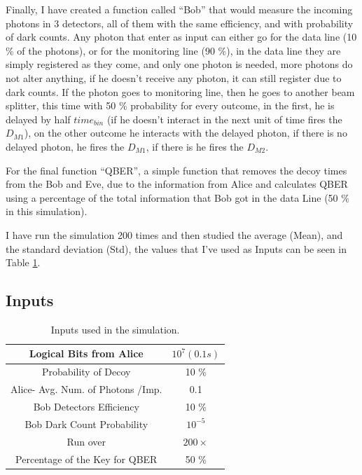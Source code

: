 \begin{refsection}
Finally, I have created a function called ``Bob'' that would measure the incoming photons in 3 detectors, all of them with the same efficiency, and with probability of dark counts. Any photon that enter as input can either go for the data line (10 \% of the photons), or for the monitoring line (90 \%), in the data line they are simply registered as they come, and only one photon is needed, more photons do not alter anything, if he doesn't receive any photon, it can still register due to dark counts. If the photon goes to monitoring line, then he goes to another beam splitter, this time with 50 \% probability for every outcome, in the first, he is delayed by half $time_{bin}$ (if he doesn't interact in the next unit of time fires the $D_{M1}$), on the other outcome he interacts with the delayed photon, if there is no delayed photon, he fires the $D_{M1}$, if there is he fires the $D_{M2}$.

For the final function ``QBER'', a simple function that removes the decoy times from the Bob and Eve, due to the information from Alice and calculates QBER using a percentage of the total information that Bob got in the data Line (50 \% in this simulation).

I have run the simulation 200 times and then studied the average (Mean), and the standard deviation (Std), the values that I've used as Inputs can be seen in Table \ref{Inputs}.

\subsection*{Inputs}

\begin{table}[hbt!]
	\centering
	\begin{tabular}{|c|c|}
		\hline
		Logical Bits from Alice & $10^{7} (0.1 s)$ \\ \hline
		Probability of Decoy & 10 \% \\ \hline
		Alice- Avg. Num. of Photons /Imp. & 0.1\\ \hline
		Bob Detectors Efficiency & 10 \% \\ \hline
		Bob Dark Count Probability & $10^{-5}$ \\ \hline
		Run over & $200 \times$\\ \hline
		Percentage of the Key for QBER & 50 \% \\ \hline
	\end{tabular}
	\caption{Inputs used in the simulation.}
	\label{Inputs}
\end{table}


\end{refsection}

